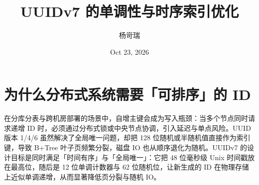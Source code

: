 \title{UUIDv7 的单调性与时序索引优化}
\author{杨岢瑞}
\date{Oct 23, 2026}
\maketitle
\chapter{为什么分布式系统需要「可排序」的 ID}
在分库分表与跨机房部署的场景中，自增主键会成为写入瓶颈：当多个节点同时请求递增 ID 时，必须通过分布式锁或中央节点协调，引入延迟与单点风险。UUID 版本 1/4/6 虽然解决了全局唯一问题，却把 128 位随机或半随机值直接作为索引键，导致 B+Tree 叶子页频繁分裂，磁盘 IO 也从顺序退化为随机。UUIDv7 的设计目标是同时满足「时间有序」与「全局唯一」：它把 48 位毫秒级 Unix 时间戳放在最高位，随后是 12 位单调计数器与 62 位随机位，让新生成的 ID 在物理存储上近似单调递增，从而显著降低页分裂与随机 IO。\par
